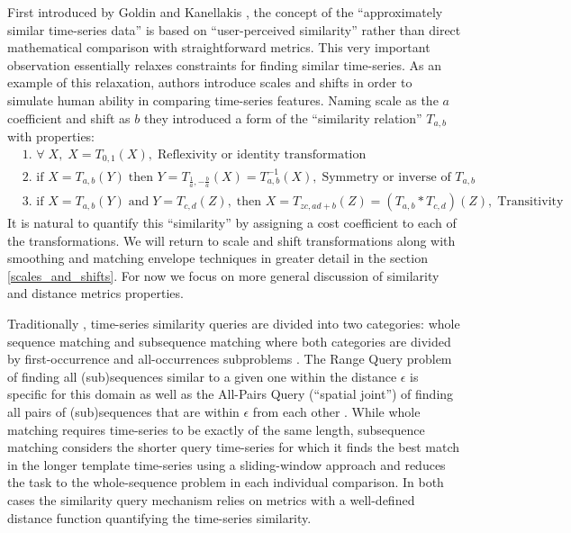 First introduced by Goldin and Kanellakis \cite{citeulike:3815880}, the concept of the ``approximately similar time-series data'' is based on ``user-perceived similarity'' rather than direct mathematical comparison with straightforward metrics. This very important observation essentially relaxes constraints for finding similar time-series. As an example of this relaxation, authors introduce scales and shifts in order to simulate human ability in comparing time-series features. Naming scale as the $a$ coefficient and shift as $b$ they introduced a form of the ``similarity relation'' $T_{a,b}$ with properties:
\begin{align}
 & \text{1. } \forall \; X, \; X=T_{0,1}(X), \; \text{Reflexivity or identity transformation} \\
 & \text{2. } \text{if } X=T_{a,b}(Y) \; \text{then } Y=T_{\frac{1}{a},-\frac{b}{a}}(X) = T^{-1}_{a,b}(X), \; \text{Symmetry or inverse of $T_{a,b}$} \\
 & \text{3. } \text{if } X=T_{a,b}(Y) \; \text{and} \; Y=T_{c,d}(Z), \; \text{then } X=T_{zc, ad+b}(Z) = (T_{a,b} * T_{c,d})(Z), \; \text{Transitivity}
\end{align}
It is natural to quantify this ``similarity'' by assigning a cost coefficient to each of the transformations. We will return to scale and shift transformations along with smoothing and matching envelope techniques in greater detail in the section \ref{scales_and_shifts}. For now we focus on more general discussion of similarity and distance metrics properties.

Traditionally \cite{citeulike:3973409}, time-series similarity queries are divided into two categories: whole sequence matching and subsequence matching where both categories are divided by first-occurrence and all-occurrences subproblems \cite{citeulike:3815880}. The Range Query problem of finding all (sub)sequences similar to a given one within the distance $\epsilon$ is specific for this domain as well as the All-Pairs Query (``spatial joint'') of finding all pairs of (sub)sequences that are within $\epsilon$ from each other \cite{citeulike:3973409}. While whole matching requires time-series to be exactly of the same length, subsequence matching considers the shorter query time-series for which it finds the best match in the longer template time-series using a sliding-window approach and reduces the task to the whole-sequence problem in each individual comparison. In both cases the similarity query mechanism relies on metrics with a well-defined distance function quantifying the time-series similarity. 

